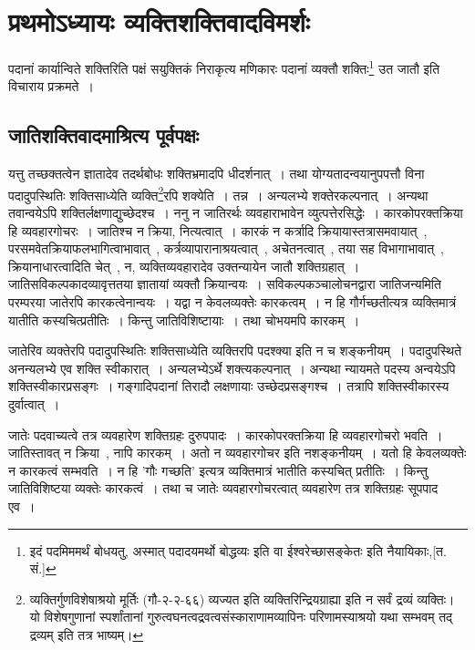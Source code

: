 \chapter{प्रथमोऽध्यायः  व्यक्तिशक्तिवादविमर्शः}

	पदानां कार्यान्विते शक्तिरिति पक्षं सयुक्तिकं निराकृत्य मणिकारः पदानां व्यक्तौ शक्तिः\footnote{इदं पदमिममर्थं बोधयतु, अस्मात् पदादयमर्थो बोद्धव्यः इति वा ईश्वरेच्छासङ्केतः इति नैयायिकाः,[त. सं.]} उत जातौ इति विचाराय प्रक्रमते~।

	\section{जातिशक्तिवादमाश्रित्य पूर्वपक्षः}

	\begin{small}
		यत्तु तच्छक्तत्वेन ज्ञातादेव तदर्थबोधः शक्तिभ्रमादपि धीदर्शनात्~। तथा योग्यतादन्वयानुपपत्तौ विना पदादुपस्थितिः शक्तिसाध्येति व्यक्ति\footnote{व्यक्तिर्गुणविशेषाश्रयो मूर्तिः (गौ-२-२-६६) व्यज्यत इति व्यक्तिरिन्द्रियग्राह्या इति न सर्वं द्रव्यं व्यक्तिः। यो विशेषगुणानां स्पर्शांतानां गुरुत्वघनत्वद्रवत्वसंस्काराणामव्यापिनः परिणामस्याश्रयो यथा सम्भवम् तद् द्रव्यम् इति तत्र भाष्यम्।}रपि शक्येति~। तन्न~। अन्यलभ्ये शक्तेरकल्पनात्~। अन्यथा तवान्वयेऽपि शक्तिर्लक्षणाद्युच्छेदश्च~। ननु न जातिरर्थः व्यवहाराभावेन व्युत्पत्तेरसिद्धेः~। कारकोपरक्तक्रिया हि व्यवहारगोचरः~। जातिश्च न क्रिया, नित्यत्वात्~। कारकं न कर्त्रादि क्रियायास्तत्रासमवायात्~, परसमवेतक्रियाफलभागित्वाभावात्~, कर्त्रव्यापारानाश्रयत्वात्~, अचेतनत्वात्~, तया सह विभागाभावात्~, क्रियानाधारत्वादिति चेत्~, न, व्यक्तिव्यवहारादेव उक्तन्यायेन जातौ शक्तिग्रहात्~। जातिसविकल्पकादव्यावृत्ततया ज्ञातायां व्यक्तौ क्रियान्वयः~। सविकल्पकञ्चालोचनद्वारा जातिजन्यमिति परम्परया जातेरपि कारकत्वेनान्वयः~। यद्वा न केवलव्यक्तेः कारकत्वम्~। न हि गौर्गच्छतीत्यत्र व्यक्तिमात्रं यातीति कस्यचित्प्रतीतिः~। किन्तु जातिविशिष्टायाः~। तथा चोभयमपि कारकम्~।
	\end{small}

	जातेरिव व्यक्तेरपि पदादुपस्थितिः शक्तिसाध्येति व्यक्तिरपि पदश्क्या इति न च शङ्कनीयम्~। पदादुपस्थिते अनन्यलभ्ये एव शक्ति स्वीकारात्~। अन्यलभ्येऽर्थे शक्त्यकल्पनात्~। अन्यथा न्यायमते पदस्य अन्वयेऽपि शक्तिस्वीकारप्रसङ्गः~। गङ्गादिपदानां तिरादौ लक्षणायाः उच्छेदप्रसङ्गश्च~। तत्रापि शक्तिस्वीकारस्य दुर्वात्वात्~।

	जातेः पदवाच्यत्वे तत्र व्यवहारेण  शक्तिग्रहः दुरुपपादः~। कारकोपरक्तक्रिया हि व्यवहारगोचरो भवति~। जातिस्तावत् न क्रिया~, नापि कारकम्~। अतो न व्यवहारगोचर इति नशङ्कनीयम्~। यतो हि केवलव्यक्तेः न कारकत्वं सम्भवति~। न हि 'गौः गच्छति' इत्यत्र व्यक्तिमात्रं भातीति कस्यचित् प्रतीतिः~। किन्तु जातिविशिष्टया व्यक्तेः कारकत्वं~। तथा च जातेः व्यवहारगोचरत्वात् व्यवहारेण तत्र शक्तिग्रहः सूपपाद एव~।

